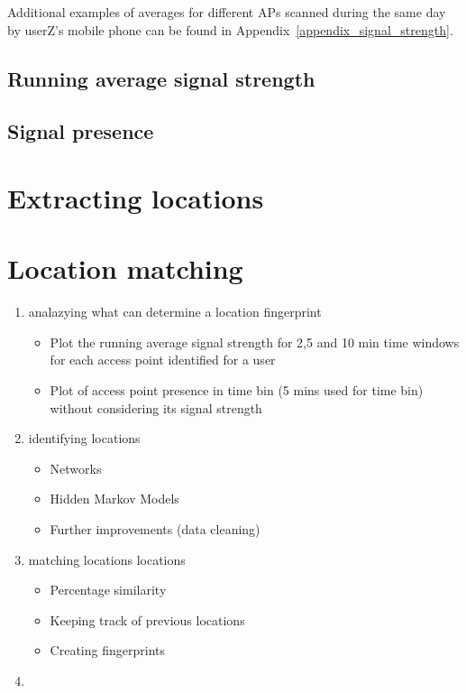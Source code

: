Additional examples of averages for different APs scanned during the same day by
userZ's mobile phone can be found in Appendix~\ref{appendix_signal_strength}.

\subsection{Running average signal strength}
\subsection{Signal presence}

\section{Extracting locations}
\section{Location matching}

\begin{enumerate}
  \item analazying what can determine a location fingerprint
	\begin{itemize}
		\item Plot the running average signal strength for 2,5 and 10 min time windows
		for each access point identified for a user
		\item Plot of access point presence in time bin (5 mins used for time bin)
		without considering its signal strength
	\end{itemize}
  \item identifying locations
	\begin{itemize}
		\item Networks 
		\item Hidden Markov Models 
		\item Further improvements (data cleaning)
	\end{itemize}
  \item matching locations locations
	\begin{itemize}
		\item Percentage similarity 
		\item Keeping track of previous locations 
		\item Creating fingerprints
	\end{itemize}
  \item  
\end{enumerate}